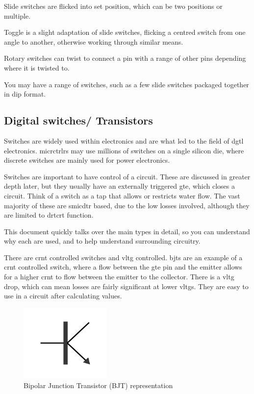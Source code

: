 \documentclass[a4paper,11pt]{report}
\begin{document}
Slide switches are flicked into set position, which can be two positions or multiple.

Toggle is a slight adaptation of slide switches, flicking a centred switch from one angle to another, otherwise working through similar means.

Rotary switches can twist to connect a pin with a range of other pins depending where it is twisted to.

You may have a range of switches, such as a few slide switches packaged together in \gls{dip} format.

\vspace*{1\baselineskip}

\subsection{Digital switches/ Transistors}

Switches are widely used within electronics and are what led to the field of \gls{dgtl} electronics. \gls{micrctrlr}s may use millions of switches on a single silicon \gls{die}, where discrete switches are mainly used for power electronics.

Switches are important to have control of a circuit. These are discussed in greater depth later, but they usually have an externally triggered \gls{gte}, which closes a circuit. Think of a switch as a tap that allows or restricts water flow. The vast majority of these are \gls{smicdtr} based, due to the low losses involved, although they are limited to \gls{drtcrt} function.

This document quickly talks over the main types in detail, so you can understand why each are used, and to help understand surrounding circuitry.

There are \gls{crnt} controlled switches and \gls{vltg} controlled. \gls{bjt}s are an example of a \gls{crnt} controlled switch, where a flow between the \gls{gte} pin and the emitter allows for a higher \gls{crnt} to flow between the emitter to the collector. There is a \gls{vltg} drop, which can mean losses are fairly significant at lower \gls{vltg}s. They are easy to use in a circuit after calculating values.

\begin{figure}[H]
\centering
\includegraphics[width=0.4\textwidth]{BJT}
\caption{Bipolar Junction Transistor (BJT) representation}
\end{figure}
\end{document}
